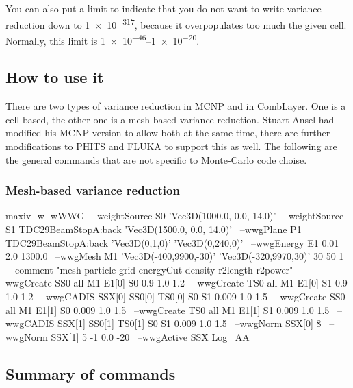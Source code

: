 You can also put a limit to indicate that you do not want to write variance reduction down to \num[retain-unity-mantissa=false]{1e-317}, because it overpopulates too much the given cell. Normally, this limit is \numrange[retain-unity-mantissa=false]{1e-46}{1e-20}.


\subsection{How to use it}

There are two types of variance reduction in MCNP and in CombLayer.
One is a cell-based, the other one is a mesh-based variance reduction.
Stuart Ansel had modified his MCNP version to allow both at the same time,
there are further modifications to PHITS and FLUKA to support this as well.
The following are the general commands that are not specific to Monte-Carlo
code choise.



\subsubsection{Mesh-based variance reduction}
\label{sec:vr:cadis:mesh}
 \label{bash:vr:cadis:mesh:run}

\begin{bash}
maxiv -w -wWWG \ 
 --weightSource S0 'Vec3D(1000.0, 0.0, 14.0)' \
 --weightSource S1 TDC29BeamStopA:back 'Vec3D(1500.0, 0.0, 14.0)' \
 --wwgPlane P1 TDC29BeamStopA:back 'Vec3D(0,1,0)' 'Vec3D(0,240,0)' \
 --wwgEnergy E1 0.01 2.0 1300.0 \
 --wwgMesh M1 'Vec3D(-400,9900,-30)' 'Vec3D(-320,9970,30)' 30 50 1 \
 --comment "mesh particle grid energyCut density r2length r2power"  \
 --wwgCreate SS0 all M1 E1[0] S0 0.9 1.0 1.2 \
 --wwgCreate TS0 all M1 E1[0] S1 0.9 1.0 1.2 \
 --wwgCADIS SSX[0] SS0[0] TS0[0] S0 S1 0.009 1.0 1.5 \
 --wwgCreate SS0 all M1 E1[1] S0 0.009 1.0 1.5 \
 --wwgCreate TS0 all M1 E1[1] S1 0.009 1.0 1.5 \
 --wwgCADIS SSX[1] SS0[1] TS0[1] S0 S1 0.009 1.0 1.5 \
 --wwgNorm SSX[0] 8 \
 --wwgNorm SSX[1] 5 -1 0.0 -20 \
 --wwgActive SSX Log \
 AA
\end{bash}

\subsection*{Summary of commands}

